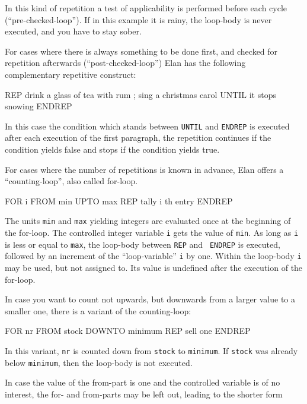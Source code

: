 \noindent
In this kind of repetition a test of applicability is performed
before each cycle (``pre-checked-loop''). If in this example
it is rainy, the loop-body is never executed, and you have to
stay sober.

For cases where there is always something to be done first, and
checked for repetition afterwards (``post-checked-loop'') Elan
has the following complementary repetitive construct:

\begin{elan}
        REP
          drink a glass of tea with rum ;
          sing a christmas carol
        UNTIL
          it stops snowing
        ENDREP
\end{elan}

\noindent
In this case the condition which stands between {\tt UNTIL} and
{\tt ENDREP} is executed after each execution of the first paragraph,
the repetition continues if the condition yields false and stops
if the condition yields true.

For cases where the number of repetitions is known in advance,
Elan offers a ``counting-loop'', also called for-loop.

\begin{elan}
        FOR i FROM min UPTO max
        REP
          tally i th entry
        ENDREP
\end{elan}

\noindent
The units {\tt min} and {\tt max} yielding integers are evaluated
once at the beginning of the for-loop. The controlled integer variable
{\tt i} gets the value of {\tt min}. As long as {\tt i} is less
or equal to {\tt max}, the loop-body between {\tt REP} and {\tt
ENDREP} is executed, followed by an increment of the ``loop-variable''
{\tt i} by one. Within the loop-body {\tt i} may be used, but
not assigned to. Its value is undefined after the execution of
the for-loop.

In case you want to count not upwards, but downwards from a larger
value to a smaller one, there is a variant of the counting-loop:

\begin{elan}
        FOR nr FROM stock DOWNTO minimum
        REP
          sell one
        ENDREP
\end{elan}
 
\noindent
In this variant, {\tt nr} is counted down from {\tt stock} to
{\tt minimum}. If {\tt stock} was already below {\tt minimum},
then the loop-body is not executed.

In case the value of the from-part is one and the controlled
variable is of no interest, the for- and from-parts may be left
out, leading to the shorter form

